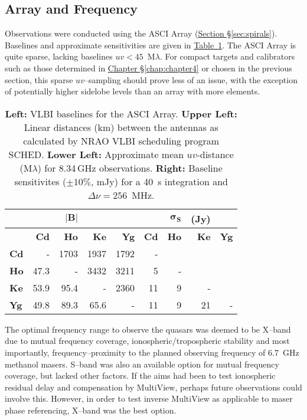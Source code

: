 	\subsection{Array and Frequency}
		Observations were conducted using the ASCI Array (\hyperref[sec:spirals]{Section \S\ref*{sec:spirals}}). Baselines and approximate sensitivities are given in \hyperref[tab:ascibaselines]{Table~\ref*{tab:ascibaselines}}. The ASCI Array is quite sparse, lacking baselines $uv<45$~M$\lambda$. For compact targets and calibrators such as those determined in \hyperref[chap:chapter4]{Chapter \S\ref*{chap:chapter4}} or chosen in the previous section, this sparse $uv$--sampling should prove less of an issue, with the exception of potentially higher sidelobe levels than an array with more elements.
		\begin{table}[H]
			\centering
			\caption[ACSI baselines]{{\bf Left:} VLBI baselines for the ASCI Array. {\bf Upper Left:} Linear distances (km) between the antennas as calculated by NRAO VLBI scheduling program SCHED. {\bf Lower Left:} Approximate mean $uv$-distance (M$\lambda$) for 8.34\,GHz  observations. {\bf Right:} Baseline sensitivites ($\pm10\%$, mJy) for a 40~s integration and $\Delta\nu=256$~MHz. }\label{tab:ascibaselines}
			{\onehalfspacing\small
				\begin{tabular}{l| rrrr |rrrr}
					\toprule
		            \hline
				            &        &$|\textbf{B}|$&  &        &&$\boldsymbol{\sigma_S}$&\textbf{(Jy)}&           \\\hline
						    &{\bf Cd}&{\bf Ho}&{\bf Ke}&{\bf Yg}&{\bf Cd}&{\bf Ho}&{\bf Ke}&{\bf Yg}\\ \hline
					{\bf Cd}&  -     & 1703   & 1937   & 1792   & -      &        &        &        \\
					{\bf Ho}& 47.3   &   -    & 3432   & 3211   & 5      & -      &        &        \\
					{\bf Ke}& 53.9   &  95.4  &  -     & 2360   & 11     & 9      & -      &        \\
					{\bf Yg}& 49.8   &  89.3  & 65.6   &   -    & 11     & 9      & 21     &  -     \\\bottomrule
				\end{tabular}
			}
		\end{table}
		The optimal frequency range to observe the quasars was deemed to be X--band due to mutual frequency coverage, ionospheric/tropospheric stability and most importantly, frequency--proximity to the planned observing frequency of 6.7~GHz methanol masers. S--band was also an available option for mutual frequency coverage, but lacked other factors. If the aims had been to test ionospheric residual delay and compensation by MultiView, perhaps future observations could involve this. However, in order to test inverse MultiView as applicable to maser phase referencing, X--band was the best option.
		
